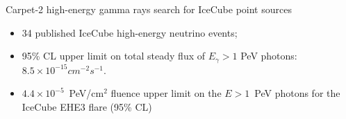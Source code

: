\begin{frame}{Carpet-2 high-energy gamma rays search for IceCube point sources}
\begin{itemize}
 \item 34 published IceCube high-energy neutrino events;
  \item 95\% CL upper limit on total steady flux of $E_{\gamma} > 1$ PeV photons: $8.5 \times 10^{-15} cm^{-2}s^{-1}$. 
  \item $4.4 \times 10^{-5}$~PeV/cm$^2$ fluence upper limit on the $E > 1$~PeV photons for the IceCube EHE3 flare (95\% CL)
\end{itemize}
\end{frame}
